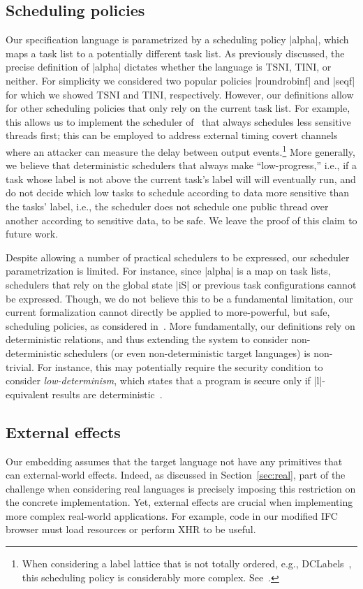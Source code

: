 \subsection{Scheduling policies}
Our specification language is parametrized by a scheduling policy
|alpha|, which maps a task list to a potentially different task list.
%
As previously discussed, the precise definition of |alpha|
dictates whether the language is TSNI, TINI, or neither.
%
For simplicity we considered two popular policies |roundrobinf| and
|seqf| for which we showed TSNI and TINI, respectively.
%
However, our definitions allow for other scheduling policies that only
rely on the current task list.
%
For example, this allows us to implement the scheduler of~\tocite{}
that always schedules less sensitive threads first; this can be
employed to address external timing covert channels where an attacker
can measure the delay between output events.\footnote{
  When considering a label lattice that is not totally ordered, e.g.,
  DCLabels~\tocite{}, this scheduling policy is considerably more
  complex. See~\tocite{}.
}
%
More generally, we believe that deterministic schedulers that always
make ``low-progress,'' i.e., if a task whose label is not above the
current task's label will will eventually run, and do not decide which
low tasks to schedule according to data more sensitive than the tasks'
label, i.e., the scheduler does not schedule one public thread over
another according to sensitive data, to be safe.
%
We leave the proof of this claim to future work.
%

Despite allowing a number of practical schedulers to be expressed, our
scheduler parametrization is limited.
%
For instance, since |alpha| is a map on task lists, schedulers that
rely on the global state |iS| or previous task configurations cannot
be expressed.
%
Though, we do not believe this to be a fundamental limitation, our
current formalization cannot directly be applied to more-powerful, but
safe, scheduling policies, as considered in~\tocite{}.
%
More fundamentally, our definitions rely on deterministic relations,
and thus extending the system to consider non-deterministic schedulers
(or even non-deterministic target languages) is non-trivial.
%
For instance, this may potentially require the security condition to
consider \emph{low-determinism}, which states that a program is secure
only if |l|-equivalent results are deterministic~\tocite{}. %

\subsection{External effects}
\label{sec:extensions:external}
Our embedding assumes that the target language not have any
primitives that can external-world effects.
%
Indeed, as discussed in Section~\ref{sec:real}, part of the challenge
when considering real languages is precisely imposing this restriction
on the concrete implementation.
%
Yet, external effects are crucial when implementing more complex
real-world applications.
%
For example, code in our modified IFC browser must load resources or
perform XHR to be useful.

